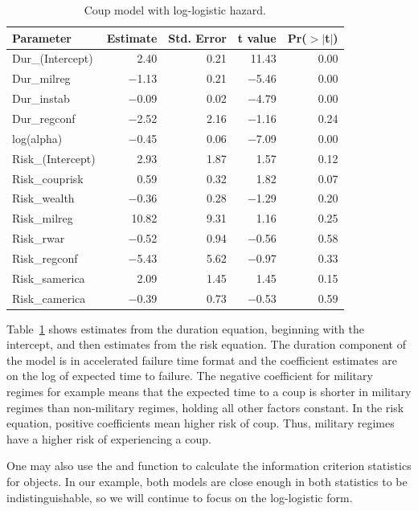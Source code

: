 \begin{table}[ht]
\centering
\begin{tabular}{lrrrr}
  \hline
Parameter & Estimate & Std. Error & t value & Pr($>$$|$t$|$) \\ 
  \hline
Dur\_(Intercept) & 2.40 & 0.21 & 11.43 & 0.00 \\ 
  Dur\_milreg & $-$1.13 & 0.21 & $-$5.46 & 0.00 \\ 
  Dur\_instab & $-$0.09 & 0.02 & $-$4.79 & 0.00 \\ 
  Dur\_regconf & $-$2.52 & 2.16 & $-$1.16 & 0.24 \\ 
  log(alpha) & $-$0.45 & 0.06 & $-$7.09 & 0.00 \\ 
  Risk\_(Intercept) & 2.93 & 1.87 & 1.57 & 0.12 \\ 
  Risk\_couprisk & 0.59 & 0.32 & 1.82 & 0.07 \\ 
  Risk\_wealth & $-$0.36 & 0.28 & $-$1.29 & 0.20 \\ 
  Risk\_milreg & 10.82 & 9.31 & 1.16 & 0.25 \\ 
  Risk\_rwar & $-$0.52 & 0.94 & $-$0.56 & 0.58 \\ 
  Risk\_regconf & $-$5.43 & 5.62 & $-$0.97 & 0.33 \\ 
  Risk\_samerica & 2.09 & 1.45 & 1.45 & 0.15 \\ 
  Risk\_camerica & $-$0.39 & 0.73 & $-$0.53 & 0.59 \\ 
   \hline
\end{tabular}
\caption{Coup model with log-logistic hazard.} 
\label{loglog_table}
\end{table}

Table~\ref{loglog_table} shows estimates from the duration equation,
beginning with the intercept, and then estimates from the risk equation.
The duration component of the model is in accelerated failure time
format and the coefficient estimates are on the log of expected time to
failure. The negative coefficient for military regimes for example means
that the expected time to a coup is shorter in military regimes than
non-military regimes, holding all other factors constant. In the risk
equation, positive coefficients mean higher risk of coup. Thus, military
regimes have a higher risk of experiencing a coup.

One may also use the  and  function to calculate the
information criterion statistics for  objects. In our
example, both models are close enough in both statistics to be
indistinguishable, so we will continue to focus on the log-logistic
form.

